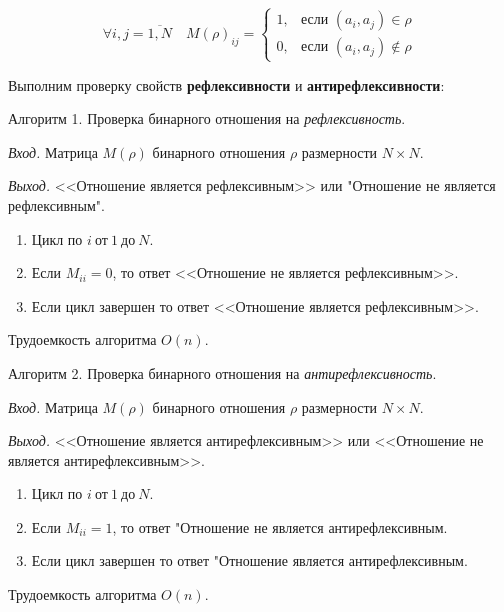 \documentclass[bachelor, och, labwork]{shiza}
\begin{document}
    \begin{equation*}
        \forall i,j = \overline{1,N} \quad M(\rho)_{ij} = 
            \begin{cases}
                1, &\text{если $(a_i,a_j) \in \rho$}\\
                0, &\text{если  $(a_i,a_j) \not\in \rho$}
            \end{cases}
    \end{equation*}


Выполним проверку свойств \textbf{рефлексивности} и \textbf{антирефлексивности}:

Алгоритм 1. Проверка бинарного отношения на \textit{рефлексивность}.

\textit{Вход.} Матрица $M(\rho)$ бинарного отношения $\rho$ размерности
$N \times N$.

\textit{Выход.} <<Отношение является рефлексивным>> или "Отношение не является 
рефлексивным".

\begin{enumerate}
        
    \item Цикл по $i ~\text{от}~ 1 ~\text{до}~ N$.

    \item Если $M_{ii} = 0$, то ответ <<Отношение не является рефлексивным>>. 

    \item Если цикл завершен то ответ <<Отношение является рефлексивным>>.
    
\end{enumerate}
Трудоемкость алгоритма $O(n)$.

Алгоритм 2. Проверка бинарного отношения на \textit{антирефлексивность}.

\textit{Вход.} Матрица $M(\rho)$ бинарного отношения $\rho$ размерности
$N \times N$.

\textit{Выход.} <<Отношение является антирефлексивным>> или <<Отношение не является 
антирефлексивным>>.

\begin{enumerate}
        
    \item Цикл по $i ~\text{от}~ 1 ~\text{до}~ N$.

    \item Если $M_{ii} = 1$, то ответ "Отношение не является антирефлексивным. 

    \item Если цикл завершен то ответ "Отношение является антирефлексивным.
    
\end{enumerate}
Трудоемкость алгоритма $O(n)$.
\end{document}
